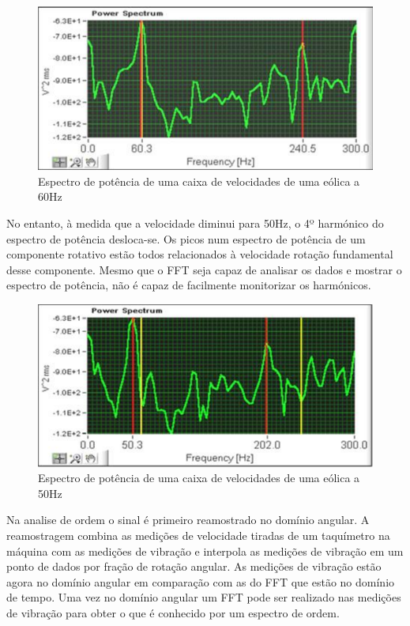 \begin{figure}[H]
\centering
\includegraphics[scale=0.3]{figs/power_spectrum1}
\caption{Espectro de potência de uma caixa de velocidades de uma eólica a 60Hz}\label{power espectrum 1}
\end{figure}


No entanto, à medida que a velocidade diminui para 50Hz, o 4º harmónico do espectro de potência desloca-se. Os picos num espectro de potência de um componente rotativo estão todos relacionados à velocidade rotação  fundamental desse componente. Mesmo que o FFT seja capaz de analisar os dados e mostrar o espectro de potência, não é capaz de facilmente monitorizar os harmónicos.

\begin{figure}[H]
\centering
\includegraphics[scale=0.3]{figs/power_spectrum2}
\caption{Espectro de potência de uma caixa de velocidades de uma eólica a 50Hz}\label{power espectrum 2}
\end{figure}

Na analise de ordem o sinal é primeiro reamostrado no domínio angular. A reamostragem combina as medições de velocidade tiradas de um taquímetro na máquina com as medições de vibração e interpola as medições de vibração em um ponto de dados por fração de rotação angular. As medições de vibração estão agora no domínio angular em comparação com as do FFT que estão no domínio de tempo. Uma vez no domínio angular um FFT pode ser realizado nas medições de vibração para obter o que é conhecido por um espectro de ordem.



